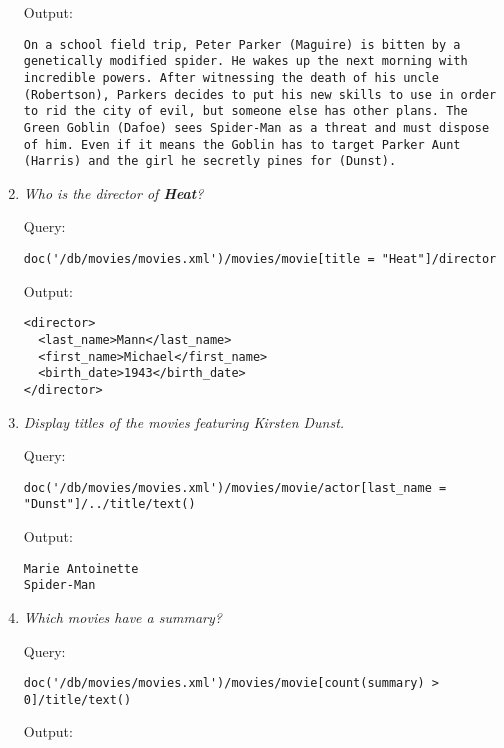\documentclass[a4paper, notitlepage]{article}
\begin{document}
\begin{enumerate}
Output:
  
\begin{lstlisting}
On a school field trip, Peter Parker (Maguire) is bitten by a genetically modified spider. He wakes up the next morning with incredible powers. After witnessing the death of his uncle (Robertson), Parkers decides to put his new skills to use in order to rid the city of evil, but someone else has other plans. The Green Goblin (Dafoe) sees Spider-Man as a threat and must dispose of him. Even if it means the Goblin has to target Parker Aunt (Harris) and the girl he secretly pines for (Dunst).
\end{lstlisting}  

\item 
  \emph{Who is the director of \textbf{Heat}?} 
  
Query: 
  
\begin{lstlisting}
doc('/db/movies/movies.xml')/movies/movie[title = "Heat"]/director
\end{lstlisting}
  
Output:
  
\begin{lstlisting}
<director>
  <last_name>Mann</last_name>
  <first_name>Michael</first_name>
  <birth_date>1943</birth_date>
</director>
\end{lstlisting}  
  
\item 
  \emph{Display titles of the movies featuring Kirsten Dunst.} 
  
Query: 
  
\begin{lstlisting}
doc('/db/movies/movies.xml')/movies/movie/actor[last_name = "Dunst"]/../title/text()
\end{lstlisting}
  
Output:
  
\begin{lstlisting}
Marie Antoinette
Spider-Man
\end{lstlisting}   

\item
  \emph{Which movies have a summary?}
  
Query:
  
\begin{lstlisting}
doc('/db/movies/movies.xml')/movies/movie[count(summary) > 0]/title/text()
\end{lstlisting}
  
Output:
  

\end{enumerate}
\end{document}
